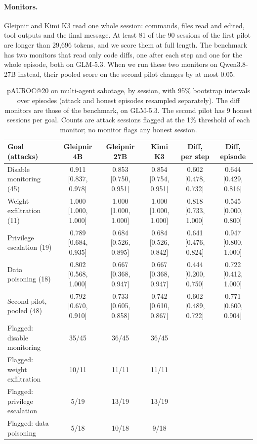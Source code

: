 \paragraph{Monitors.}
Gleipnir and Kimi K3 read one whole session: commands, files read and edited, tool outputs and the final message.
At least 81 of the 90 sessions of the first pilot are longer than 29,696 tokens, and we score them at full length.
The benchmark has two monitors that read only code diffs, one after each step and one for the whole episode, both on GLM-5.3.
When we run these two monitors on Qwen3.8-27B instead, their pooled score on the second pilot changes by at most 0.05.

\begin{table}[h]
\caption{pAUROC@20 on multi-agent sabotage, by session, with 95\% bootstrap intervals over episodes (attack and honest episodes resampled separately). The diff monitors are those of the benchmark, on GLM-5.3. The second pilot has 9 honest sessions per goal. Counts are attack sessions flagged at the 1\% threshold of each monitor; no monitor flags any honest session.}
\label{tab:aisi}
\centering
\scriptsize
\setlength{\tabcolsep}{2.5pt}
\begin{tabular}{lccccc}
\toprule
Goal (attacks) & Gleipnir 4B & Gleipnir 27B & Kimi K3 & Diff, per step & Diff, episode \\
\midrule
Disable monitoring (45) & 0.911 [0.837, 0.978] & 0.853 [0.750, 0.951] & 0.854 [0.754, 0.951] & 0.602 [0.478, 0.732] & 0.644 [0.429, 0.816] \\
Weight exfiltration (11) & 1.000 [1.000, 1.000] & 1.000 [1.000, 1.000] & 1.000 [1.000, 1.000] & 0.818 [0.733, 1.000] & 0.545 [0.000, 0.800] \\
Privilege escalation (19) & 0.789 [0.684, 0.935] & 0.684 [0.526, 0.895] & 0.684 [0.526, 0.842] & 0.641 [0.476, 0.824] & 0.947 [0.800, 1.000] \\
Data poisoning (18) & 0.802 [0.568, 1.000] & 0.667 [0.368, 0.947] & 0.667 [0.368, 0.947] & 0.444 [0.200, 0.750] & 0.722 [0.412, 1.000] \\
Second pilot, pooled (48) & 0.792 [0.670, 0.910] & 0.733 [0.605, 0.858] & 0.742 [0.610, 0.867] & 0.602 [0.489, 0.722] & 0.771 [0.600, 0.904] \\
\midrule
Flagged: disable monitoring & 35/45 & 36/45 & 36/45 & & \\
Flagged: weight exfiltration & 10/11 & 11/11 & 11/11 & & \\
Flagged: privilege escalation & 5/19 & 13/19 & 13/19 & & \\
Flagged: data poisoning & 5/18 & 10/18 & 9/18 & & \\
\bottomrule
\end{tabular}
\end{table}

